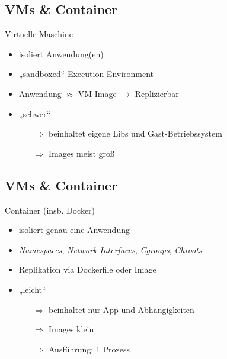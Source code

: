 \documentclass{beamer}
\begin{document}
\subsection{VMs \& Container}
\begin{frame}{\insertsubsection}
	Virtuelle Maschine
	\begin{itemize}
		\setlength\itemsep{1em}
		\item isoliert Anwendung(en)
		\item „sandboxed“ Execution Environment
		\item Anwendung $\approx$ VM-Image $\rightarrow$ Replizierbar
		\item „schwer“
		\begin{itemize}
			\item[$\Rightarrow$] beinhaltet eigene Libs und Gast-Betriebssystem
			\item[$\Rightarrow$] Images meist groß
		\end{itemize}
	\end{itemize}
\end{frame}

\subsection{VMs \& Container}
\begin{frame}{\insertsubsection}
	Container (insb. Docker)
	\begin{itemize}
		\setlength\itemsep{1em}
		\item isoliert genau eine Anwendung
		\item \textit{Namespaces}, \textit{Network Interfaces}, \textit{Cgroups}, \textit{Chroots}
		\item Replikation via Dockerfile oder Image
		\item „leicht“
		\begin{itemize}
			\item[$\Rightarrow$] beinhaltet nur App und Abhängigkeiten
			\item[$\Rightarrow$] Images klein
			\item[$\Rightarrow$] Ausführung: 1 Prozess
		\end{itemize}
	\end{itemize}
\end{frame}
\end{document}
